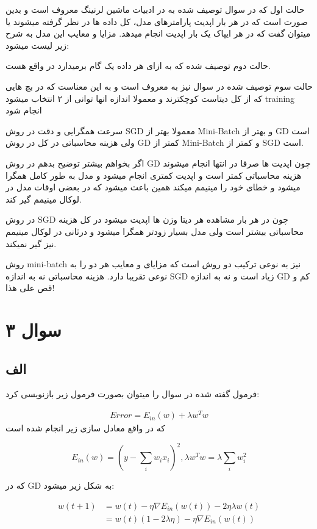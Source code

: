 \documentclass{article}[12pt]
\begin{document}
حالت اول که در سوال توصیف شده به 
در ادبیات ماشین لرنینگ معروف است و بدین صورت است که در هر بار اپدیت پارامترهای مدل، کل داده ها در نظر گرفته میشوند یا میتوان گفت که در هر ایپاک یک بار اپدیت انجام میدهد. مزایا و معایب این مدل به شرح زیر لیست میشود:


حالت دوم توصیف شده که به ازای هر داده یک گام برمیدارد در واقع 
هست. 


حالت سوم توصیف شده در سوال نیز 
به
معروف است و به این معناست که در بچ هایی که از کل دیتاست کوچکترند و معمولا اندازه انها توانی از ۲ انتخاب میشود 
training
انجام شود 


سرعت همگرایی و دقت در روش 
SGD 
معمولا بهتر از 
Mini-Batch 
و بهتر از 
GD 
است ولی 
هزینه محاسباتی در کل در روش
GD 
کمتر از 
Mini-Batch
و کمتر از SGD
است.

اگر بخواهم بیشتر توضیح بدهم در روش GD
چون اپدیت ها صرفا در انتها انجام میشوند هزینه محاسباتی کمتر است و اپدیت کمتری انجام میشود و مدل به طور کامل همگرا میشود و خطای خود را مینیمم میکند همین باعث میشود که در بعضی اوقات مدل در لوکال مینیمم گیر کند. 

در روش SGD
چون در هر بار مشاهده هر دیتا وزن ها اپدیت میشود در کل هزینه محاسباتی بیشتر است ولی مدل بسیار زودتر همگرا میشود و درثانی در لوکال مینیمم نیز گیر نمیکند. 

روش mini-batch
نیز به نوعی ترکیب دو روش است که مزایای و معایب هر دو را به نوعی تقریبا دارد. هزینه محاسباتی نه به اندازه 
SGD
زیاد است و نه به اندازه GD
کم و قص علی هذا! 
\clearpage
\section{سوال ۳}
\subsection{الف}
فرمول گفته شده در سوال را میتوان بصورت فرمول زیر بازنویسی کرد:

\begin{gather}
Error = E_{in}(w) + \lambda w^T w
\end{gather}
که در واقع معادل سازی زیر انجام شده است

\begin{equation}
E_{in}(w) = (y - \sum_i w_i x_i)^2 ,
\lambda w^T w = \lambda \sum_i w_i^2
\end{equation}

که در GD
به شکل زیر میشود:

\begin{equation}
\begin{split}
w(t+1) &= w(t) - \eta \nabla E_{in}(w(t)) - 2 \eta \lambda w(t) 
\\
 &= w(t) (1- 2\lambda \eta) - \eta \nabla E_{in}(w(t)) 
\end{split}
\end{equation}
\end{document}
